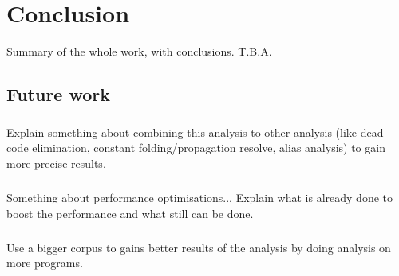 \documentclass[main.tex]{subfiles}
\begin{document}
    \chapter{Conclusion}\label{chap:conclusion}
    Summary of the whole work, with conclusions. T.B.A.
    \\
    \Blindtext %
    
    \section{Future work}
    
    \paragraph{}
    Explain something about combining this analysis to other analysis (like dead code elimination, constant folding/propagation resolve, alias analysis) to gain more precise results.
    \\
    \blindtext %
    
    \paragraph{}
    Something about performance optimisations... Explain what is already done to boost the performance and what still can be done.
    \\
    \blindtext %
        
    \paragraph{}
    Use a bigger corpus to gains better results of the analysis by doing analysis on more programs.
    \\
    \blindtext %
    
\end{document}
